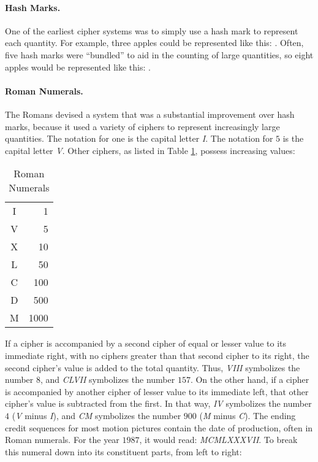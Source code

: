 \paragraph{Hash Marks.} One of the earliest cipher systems was to simply use a hash mark to represent each quantity. For example, three apples could be represented like this: \textbar \textbar \textbar. Often, five hash marks were ``bundled'' to aid in the counting of large quantities, so eight apples would be represented like this: \sout{\textbar \textbar \textbar \textbar} \textbar \textbar \textbar. 

\paragraph{Roman Numerals.} The Romans devised a system that was a substantial improvement over hash marks, because it used a variety of ciphers to represent increasingly large quantities. The notation for one is the capital letter \emph{I}. The notation for $ 5 $ is the capital letter \emph{V}. Other ciphers, as listed in Table \ref{MF:tab:roman}, possess increasing values:

\begin{table}[H]
  \begin{center}
    \begin{tabular}{ c r } \hline
      I & 1 \\
      V & 5 \\
      X & 10 \\
      L & 50 \\
      C & 100 \\
      D & 500 \\
      M & 1000 \\ \hline
    \end{tabular}
  \end{center}
  \caption{Roman Numerals}
  \label{MF:tab:roman}
\end{table}

If a cipher is accompanied by a second cipher of equal or lesser value to its immediate right, with no ciphers greater than that second cipher to its right, the second cipher's value is added to the total quantity. Thus, \emph{VIII} symbolizes the number $ 8 $, and \emph{CLVII} symbolizes the number $ 157 $. On the other hand, if a cipher is accompanied by another cipher of lesser value to its immediate left, that other cipher's value is subtracted from the first. In that way, \emph{IV} symbolizes the number $ 4 $ (\emph{V} minus \emph{I}), and \emph{CM} symbolizes the number $ 900 $ (\emph{M} minus \emph{C}). The ending credit sequences for most motion pictures contain the date of production, often in Roman numerals. For the year $ 1987 $, it would read: \emph{MCMLXXXVII}. To break this numeral down into its constituent parts, from left to right:

